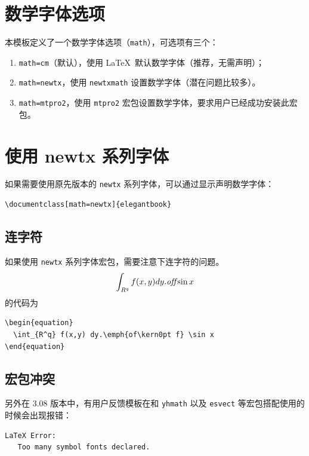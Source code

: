 \documentclass[lang=cn,newtx,10pt,scheme=chinese]{elegantbook}
\begin{document}
\section{数学字体选项}

本模板定义了一个数学字体选项（\lstinline{math}），可选项有三个：
\begin{enumerate}
  \item \lstinline{math=cm}（默认），使用 \LaTeX\ 默认数学字体（推荐，无需声明）；
  \item \lstinline{math=newtx}，使用 \lstinline{newtxmath} 设置数学字体（潜在问题比较多）。
  \item \lstinline{math=mtpro2}，使用 \lstinline{mtpro2} 宏包设置数学字体，要求用户已经成功安装此宏包。
\end{enumerate}

\section{使用 newtx 系列字体}

如果需要使用原先版本的 \lstinline{newtx} 系列字体，可以通过显示声明数学字体：

\begin{lstlisting}
\documentclass[math=newtx]{elegantbook}
\end{lstlisting}

\subsection{连字符}

如果使用 \lstinline{newtx} 系列字体宏包，需要注意下连字符的问题。
\begin{equation}
  \int_{R^q} f(x,y) dy.\emph{of\kern0pt f} \sin x
\end{equation}
的代码为
\begin{lstlisting}
\begin{equation}
  \int_{R^q} f(x,y) dy.\emph{of\kern0pt f} \sin x
\end{equation}
\end{lstlisting}

\subsection{宏包冲突}

另外在 3.08 版本中，有用户反馈模板在和 \lstinline{yhmath} 以及 \lstinline{esvect} 等宏包搭配使用的时候会出现报错：
\begin{lstlisting}
LaTeX Error:
   Too many symbol fonts declared.
\end{lstlisting}
\end{document}
